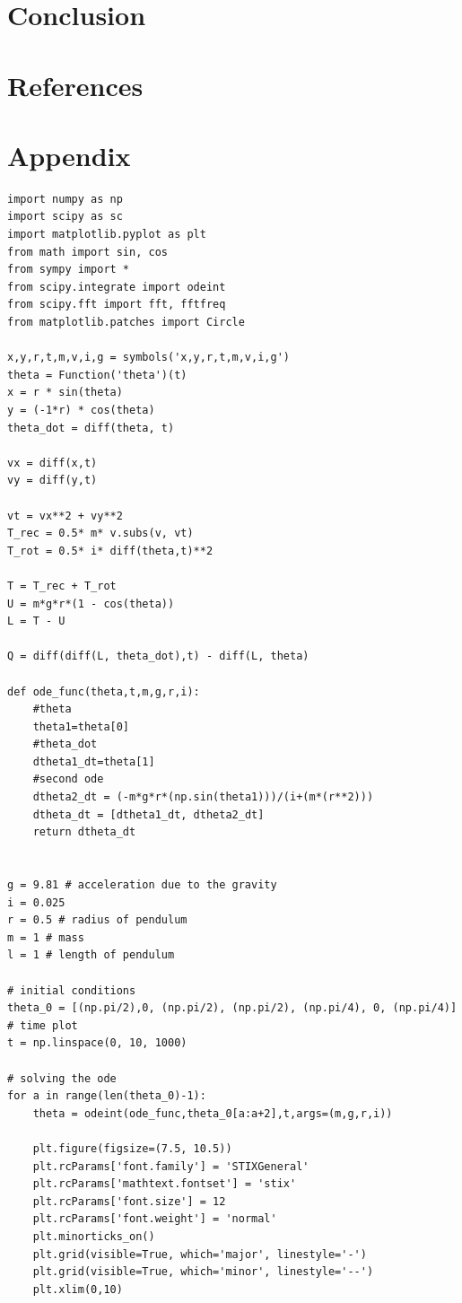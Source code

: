 \documentclass[12pt, a4paper]{article}
\begin{document}
\section{Conclusion}


\section{References}
\printbibliography[heading = none]

\section{Appendix}
\begin{verbatim}
import numpy as np
import scipy as sc
import matplotlib.pyplot as plt
from math import sin, cos
from sympy import *
from scipy.integrate import odeint
from scipy.fft import fft, fftfreq
from matplotlib.patches import Circle

x,y,r,t,m,v,i,g = symbols('x,y,r,t,m,v,i,g')
theta = Function('theta')(t)
x = r * sin(theta)
y = (-1*r) * cos(theta)
theta_dot = diff(theta, t)

vx = diff(x,t)
vy = diff(y,t)

vt = vx**2 + vy**2
T_rec = 0.5* m* v.subs(v, vt)
T_rot = 0.5* i* diff(theta,t)**2

T = T_rec + T_rot
U = m*g*r*(1 - cos(theta))
L = T - U

Q = diff(diff(L, theta_dot),t) - diff(L, theta)

def ode_func(theta,t,m,g,r,i):
    #theta
    theta1=theta[0]
    #theta_dot
    dtheta1_dt=theta[1]
    #second ode
    dtheta2_dt = (-m*g*r*(np.sin(theta1)))/(i+(m*(r**2)))
    dtheta_dt = [dtheta1_dt, dtheta2_dt]
    return dtheta_dt


g = 9.81 # acceleration due to the gravity
i = 0.025
r = 0.5 # radius of pendulum
m = 1 # mass 
l = 1 # length of pendulum  

# initial conditions
theta_0 = [(np.pi/2),0, (np.pi/2), (np.pi/2), (np.pi/4), 0, (np.pi/4)]
# time plot
t = np.linspace(0, 10, 1000)

# solving the ode
for a in range(len(theta_0)-1):
    theta = odeint(ode_func,theta_0[a:a+2],t,args=(m,g,r,i))

    plt.figure(figsize=(7.5, 10.5))
    plt.rcParams['font.family'] = 'STIXGeneral'
    plt.rcParams['mathtext.fontset'] = 'stix'
    plt.rcParams['font.size'] = 12
    plt.rcParams['font.weight'] = 'normal'
    plt.minorticks_on()
    plt.grid(visible=True, which='major', linestyle='-')
    plt.grid(visible=True, which='minor', linestyle='--')
    plt.xlim(0,10)


\end{verbatim}
\end{document}
